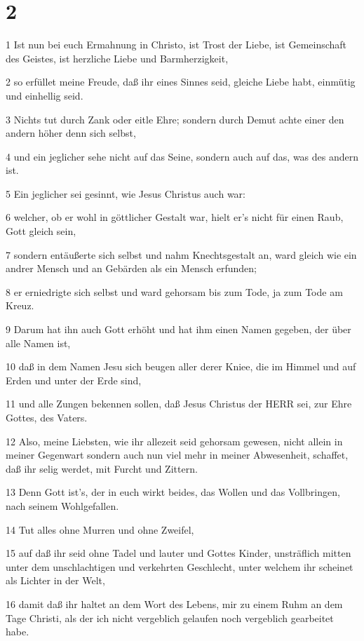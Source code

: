 \chapter{2}

\par 1 Ist nun bei euch Ermahnung in Christo, ist Trost der Liebe, ist Gemeinschaft des Geistes, ist herzliche Liebe und Barmherzigkeit,
\par 2 so erfüllet meine Freude, daß ihr eines Sinnes seid, gleiche Liebe habt, einmütig und einhellig seid.
\par 3 Nichts tut durch Zank oder eitle Ehre; sondern durch Demut achte einer den andern höher denn sich selbst,
\par 4 und ein jeglicher sehe nicht auf das Seine, sondern auch auf das, was des andern ist.
\par 5 Ein jeglicher sei gesinnt, wie Jesus Christus auch war:
\par 6 welcher, ob er wohl in göttlicher Gestalt war, hielt er's nicht für einen Raub, Gott gleich sein,
\par 7 sondern entäußerte sich selbst und nahm Knechtsgestalt an, ward gleich wie ein andrer Mensch und an Gebärden als ein Mensch erfunden;
\par 8 er erniedrigte sich selbst und ward gehorsam bis zum Tode, ja zum Tode am Kreuz.
\par 9 Darum hat ihn auch Gott erhöht und hat ihm einen Namen gegeben, der über alle Namen ist,
\par 10 daß in dem Namen Jesu sich beugen aller derer Kniee, die im Himmel und auf Erden und unter der Erde sind,
\par 11 und alle Zungen bekennen sollen, daß Jesus Christus der HERR sei, zur Ehre Gottes, des Vaters.
\par 12 Also, meine Liebsten, wie ihr allezeit seid gehorsam gewesen, nicht allein in meiner Gegenwart sondern auch nun viel mehr in meiner Abwesenheit, schaffet, daß ihr selig werdet, mit Furcht und Zittern.
\par 13 Denn Gott ist's, der in euch wirkt beides, das Wollen und das Vollbringen, nach seinem Wohlgefallen.
\par 14 Tut alles ohne Murren und ohne Zweifel,
\par 15 auf daß ihr seid ohne Tadel und lauter und Gottes Kinder, unsträflich mitten unter dem unschlachtigen und verkehrten Geschlecht, unter welchem ihr scheinet als Lichter in der Welt,
\par 16 damit daß ihr haltet an dem Wort des Lebens, mir zu einem Ruhm an dem Tage Christi, als der ich nicht vergeblich gelaufen noch vergeblich gearbeitet habe.
